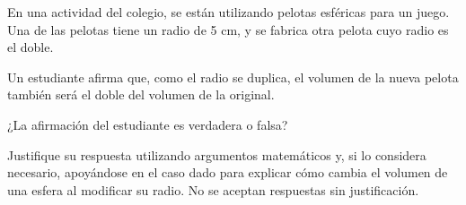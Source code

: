 En una actividad del colegio, se están utilizando pelotas esféricas para un juego. Una de las pelotas tiene un radio de 5 cm, y se fabrica otra pelota cuyo radio es el doble.

Un estudiante afirma que, como el radio se duplica, el volumen de la nueva pelota también será el doble del volumen de la original.

¿La afirmación del estudiante es verdadera o falsa?

Justifique su respuesta utilizando argumentos matemáticos y, si lo considera necesario, apoyándose en el caso dado para explicar cómo cambia el volumen de una esfera al modificar su radio. No se aceptan respuestas sin justificación.